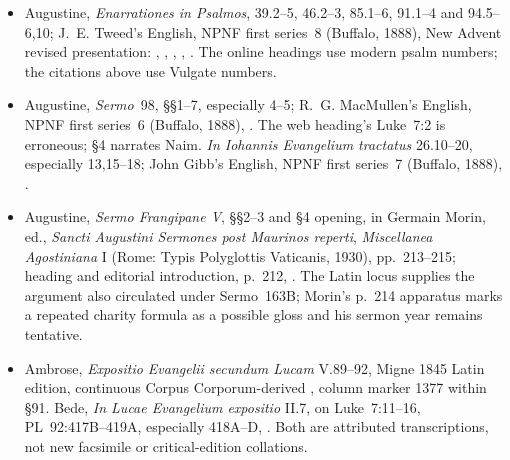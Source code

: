 {\begin{itemize}[leftmargin=1.1em,labelsep=0.35em,itemsep=0.10em,topsep=0.15em,parsep=0pt]
\item Augustine, \emph{Enarrationes in Psalmos}, 39.2--5, 46.2--3,
85.1--6, 91.1--4 and 94.5--6,10; J.~E. Tweed's English,
NPNF first series~8 (Buffalo, 1888), New Advent revised presentation:
,
,
,
,
.
The online headings use modern psalm numbers; the citations above use
Vulgate numbers.

\item Augustine, \emph{Sermo}~98, §§1--7, especially 4--5;
R.~G. MacMullen's English, NPNF first series~6 (Buffalo, 1888),
.
The web heading's Luke~7:2 is erroneous; §4 narrates Naim.
\emph{In Iohannis Evangelium tractatus} 26.10--20, especially
13,15--18; John Gibb's English, NPNF first series~7 (Buffalo, 1888),
.

\item Augustine, \emph{Sermo Frangipane V}, §§2--3 and §4 opening,
in Germain Morin, ed., \emph{Sancti Augustini Sermones post Maurinos
reperti}, \emph{Miscellanea Agostiniana} I (Rome: Typis Polyglottis
Vaticanis, 1930), pp.~213--215; heading and editorial introduction,
p.~212, .
The Latin locus supplies the argument also circulated under Sermo~163B;
Morin's p.~214 apparatus marks a repeated charity formula as a possible
gloss and his sermon year remains tentative.

\item Ambrose, \emph{Expositio Evangelii secundum Lucam} V.89--92,
Migne 1845 Latin edition, continuous Corpus Corporum-derived
,
column marker 1377 within §91. Bede, \emph{In Lucae Evangelium expositio}
II.7, on Luke~7:11--16, PL~92:417B--419A, especially 418A--D,
.
Both are attributed transcriptions, not new facsimile or critical-edition
collations.


\end{itemize}}
